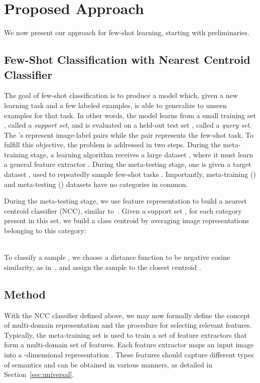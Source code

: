 \documentclass[runningheads]{llncs}
\begin{document}
\section{Proposed Approach}
We now present our approach for few-shot learning, starting
with preliminaries.

\subsection{Few-Shot Classification with Nearest Centroid Classifier}\label{sec:prelim}
The goal of few-shot classification is to produce a model which, given a new
learning task and a few labeled examples, is able to generalize to
unseen examples for that task. In other words, the model learns from a small
training set , called a
\textit{support set}, and is evaluated on a held-out test set , called a \textit{query set}. The 's
represent image-label pairs while the pair  
represents the few-shot task.
To fulfill this objective, the problem is addressed in two steps. During the
meta-training stage, a learning algorithm receives a large dataset
, where it must learn a
general feature extractor .
During the meta-testing stage, one is given a target dataset ,
used to repeatedly sample few-shot tasks .
Importantly, meta-training () and meta-testing ()
datasets have no categories in common.

During the meta-testing stage, we use feature representation  to build
a nearest centroid classifier (NCC), similar
to~\cite{mensink2013distance,snell2017prototypical}. Given a support set
, for each category present in this set, we build a class centroid
by averaging image representations belonging to this category:


\\
To classify a sample , we choose a distance function  to be
negative cosine similarity, as
in~\cite{chen19closerfewshot,gidaris2018unsupervised}, and assign the sample to
the closest centroid .


\subsection{Method}\label{sec:method}
With the NCC classifier defined above, we may now formally define the concept of multi-domain
representation and the procedure for selecting relevant features.
Typically, the meta-training set is used to train a set of 
feature extractors  that form a multi-domain set of features.
Each feature extractor maps an input image  into a -dimensional
representation . 
These features should capture different types of semantics and can be obtained in various 
manners, as detailed
in Section~\ref{sec:universal}.
\end{document}
